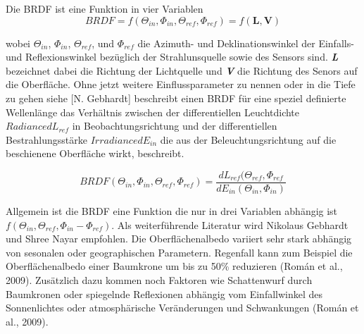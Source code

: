 \documentclass[11pt]{report}
\begin{document}
Die BRDF ist eine Funktion in vier Variablen
\begin{equation}
BRDF = f(\Theta_{in},\Phi_{in},\Theta_{ref},\Phi_{ref}) = f(\mathbf{L},\mathbf{V})
\end{equation}\newline

wobei $\Theta_{in}$, $\Phi_{in}$, $ \Theta_{ref}$, und $\Phi_{ref}$ die Azimuth- und Deklinationswinkel der Einfalls- und Reflexionswinkel bezüglich der Strahlunsquelle sowie des Sensors sind.  \textbf{\emph{L}} bezeichnet dabei die Richtung der Lichtquelle und \textbf{\emph{V}} die Richtung des Senors auf die Oberfläche. Ohne jetzt weitere Einflussparameter zu nennen oder in die Tiefe zu gehen  siehe [N. Gebhardt] beschreibt einen BRDF für eine speziel definierte Wellenlänge das Verhältnis zwischen der differentiellen Leuchtdichte \textbf{\emph{$ Radiance dL_{ref}$}} in Beobachtungsrichtung und der differentiellen Bestrahlungsstärke \textbf{\emph{$ Irradiance dE_{in}$}} die aus der Beleuchtungsrichtung auf die beschienene Oberfläche wirkt, beschreibt.

\begin{equation}
BRDF(\Theta_{in},\Phi_{in},\Theta_{ref},\Phi_{ref}) = \frac{dL_{ref}(\Theta_{ref},\Phi_{ref}}{dE_{in}(\Theta_{in},\Phi_{in})}
\end{equation}
\newline


Allgemein ist die BRDF eine Funktion die nur in drei Variablen abhängig ist $f(\Theta_{in},\Theta_{ref},\Phi_{in}-\Phi_{ref}) $. Als weiterführende Literatur wird Nikolaus Gebhardt und Shree Nayar empfohlen.
\newline
Die Oberflächenalbedo variiert sehr stark abhängig von sesonalen oder geographischen Parametern. Regenfall kann zum Beispiel die Oberflächenalbedo einer Baumkrone um bis zu 50\% reduzieren (Román et al., 2009). Zusätzlich dazu kommen noch Faktoren wie Schattenwurf durch Baumkronen oder spiegelnde Reflexionen abhängig vom Einfallwinkel des Sonnenlichtes oder atmosphärische Veränderungen und Schwankungen (Román et al., 2009).\newline

\end{document}
